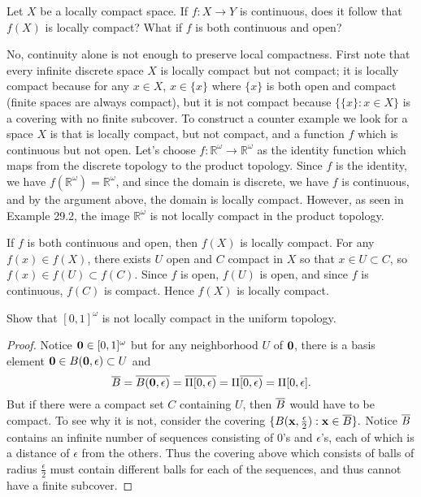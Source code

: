 \documentclass[11pt]{article}
\begin{document}
\begin{ex}{29.3}
  Let $X$ be a locally compact space. If $f: X \to Y$ is continuous, does it
  follow that $f(X)$ is locally compact? What if $f$ is both continuous and
  open?
\end{ex}
\begin{solution}
  No, continuity alone is not enough to preserve local compactness.
  First note that every infinite discrete space $X$ is locally compact but not
  compact; it is locally compact because for any $x \in X$, $x \in \{x\}$ where
  $\{x\}$ is both open and compact (finite spaces
  are always compact), but it is not compact because $\{\{x\}: x \in X\}$ is a
  covering with no finite subcover. To construct a counter example we look for a space $X$ is
  that is locally compact, but not compact, and a function $f$ which is
  continuous but not open. Let's choose $f: \mathbb{R}^\omega \to
  \mathbb{R}^\omega$ as the identity function which maps from the discrete
  topology to the product topology. Since $f$ is the identity, we have
  $f(\mathbb{R}^\omega) = \mathbb{R}^\omega$, and since the domain is discrete,
  we have $f$ is continuous, and by the argument above, the domain is locally compact.
  However, as seen in Example 29.2, the image $\mathbb{R}^\omega$ is not locally compact
  in the product topology.

  If $f$ is both continuous and open, then $f(X)$ is locally compact. For any
  $f(x) \in f(X)$, there exists $U$ open and $C$ compact in $X$ so that $x \in U
  \subset C$, so $f(x) \in f(U) \subset f(C)$. Since $f$ is open, $f(U)$ is
  open, and since $f$ is continuous, $f(C)$ is compact. Hence $f(X)$ is locally
  compact.
\end{solution}

\begin{ex}{29.4}
  Show that $[0, 1]^\omega$ is not locally compact in the uniform topology.
\end{ex}
\begin{proof}
  Notice $\vb 0 \in [0, 1]^\omega$ but for any neighborhood $U$ of $\vb 0$, there is
  a basis element $\vb 0 \in B(\vb 0, \epsilon) \subset U$ and
  \[ { \overline{B} } = { \overline{B(\vb 0, \epsilon)} } = { \overline{\Pi [0, \epsilon)} } = \Pi { \overline{[0,
  \epsilon)} } = \Pi [0, \epsilon]. \]
  But if there were a compact set $C$ containing $U$, then ${ \overline{B} }$ would have to
  be compact. To see why it is not, consider the covering $\{B(\vb x,
  \frac{\epsilon}{2}): \vb x \in { \overline{B} }\}.$ Notice ${ \overline{B} }$ contains an infinite number of
  sequences consisting of $0$'s and $\epsilon$'s, each of which is a distance of
  $\epsilon$ from the others. Thus the covering above which consists of balls of
  radius $\frac{\epsilon}{2}$ must contain different balls for each of the
  sequences, and thus cannot have a finite subcover.
\end{proof}
\end{document}
